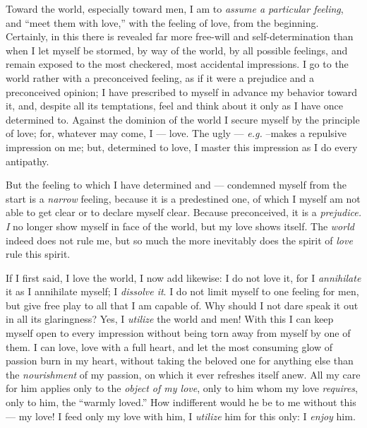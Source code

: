 Toward the world, especially toward men, I am to \textit{assume a particular 
feeling}, and ``meet them with love,'' with the feeling of love, from the 
beginning. Certainly, in this there is revealed far more free-will and 
self-determination than when I let myself be stormed, by way of the world, by 
all possible feelings, and remain exposed to the most checkered, most 
accidental impressions. I go to the world rather with a preconceived feeling, 
as if it were a prejudice and a preconceived opinion; I have prescribed to 
myself in advance my behavior toward it, and, despite all its temptations, 
feel and think about it only as I have once determined to. Against the 
dominion of the world I secure myself by the principle of love; for, whatever 
may come, I --- love. The ugly --- \textit{e.g.} --makes a repulsive impression 
on me; but, determined to love, I master this impression as I do every 
antipathy.

But the feeling to which I have determined and --- condemned myself from the 
start is a \textit{narrow} feeling, because it is a predestined one, of which 
I myself am not able to get clear or to declare myself clear. Because 
preconceived, it is a \textit{prejudice. I} no longer show myself in face of 
the world, but my love shows itself. The \textit{world} indeed does not rule 
me, but so much the more inevitably does the spirit of \textit{love} rule this 
spirit.

If I first said, I love the world, I now add likewise: I do not love it, for I 
\textit{annihilate} it as I annihilate myself; I \textit{dissolve it}. I do 
not limit myself to one feeling for men, but give free play to all that I am 
capable of. Why should I not dare speak it out in all its glaringness? Yes, I 
\textit{utilize} the world and men! With this I can keep myself open to every 
impression without being torn away from myself by one of them. I can love, 
love with a full heart, and let the most consuming glow of passion burn in my 
heart, without taking the beloved one for anything else than the 
\textit{nourishment} of my passion, on which it ever refreshes itself anew. 
All my care for him applies only to the \textit{object of my love}, only to 
him whom my love \textit{requires}, only to him, the ``warmly loved.'' How 
indifferent would he be to me without this --- my love! I feed only my love 
with him, I \textit{utilize} him for this only: I \textit{enjoy} him.

